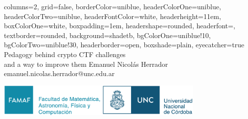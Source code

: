 \documentclass[a0paper,portrait]{baposter}
\begin{document}
\begin{poster}{
  columns=2,
	grid=false,
	borderColor=uniblue,
	headerColorOne=uniblue,
	headerColorTwo=uniblue,
	headerFontColor=white,
  headerheight=11em,
	boxColorOne=white,
  boxpadding=1em,
	headershape=rounded,
	headerfont=\Large\textsf,
	textborder=rounded,
	background=shadetb,
  bgColorOne=uniblue!10,
  bgColorTwo=uniblue!30,
	headerborder=open,
  boxshade=plain,
  eyecatcher=true
}
{
}
{\smaller Pedagogy behind crypto CTF challenges \\ and a way to improve them}
{
  \vspace{1em}
  Emanuel Nicolás Herrador\\
	{\smaller emanuel.nicolas.herrador@unc.edu.ar}
}
{\begin{minipage}{28.0em}
    \vspace{-4em}
    \includegraphics[height=4.4em]{famaf-unc-logo.png}
  \end{minipage}
}

\end{poster}
\end{document}
